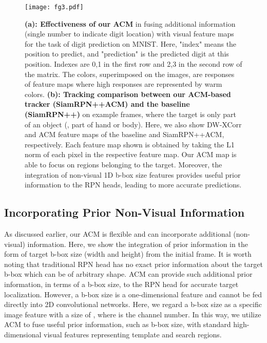 \documentclass[10pt,twocolumn,letterpaper,final]{cvpr}
\begin{document}
\begin{figure}
  \centering
  \texttt{[image: fg3.pdf]}
  \caption{\textbf{(a): Effectiveness of our ACM} in fusing additional information (single number to indicate digit location) with visual feature maps for the task of digit prediction on MNIST. Here, "index" means the position to predict, and "prediction" is the predicted digit at this position. Indexes are 0,1 in the first row and 2,3 in the second row of the  matrix. The colors, superimposed on the images, are responses of feature maps where high responses are represented by warm colors.  \textbf{(b): Tracking comparison between our ACM-based tracker (SiamRPN++ACM) and the baseline (SiamRPN++)} on example frames, where the target is only part of an object (\eg, part of hand or body). Here,
  we also show DW-XCorr and ACM feature maps of the baseline and SiamRPN++ACM, respectively. Each feature map shown is obtained by taking the L1 norm of each pixel in the respective feature map. Our ACM map is able to focus on regions belonging to the target. Moreover, the integration of non-visual 1D b-box size features provides useful prior information to the RPN heads, leading to more accurate predictions.   
 }\label{Fig:index_exp}
\end{figure}






\subsection{Incorporating Prior Non-Visual Information}  \label{section:bbox}

As discussed earlier, our ACM is flexible and can incorporate additional (non-visual) information. Here, we show the integration of prior information in the form of target b-box size (width and height) from the initial frame. It is worth noting that traditional RPN head has no exact prior information about the target b-box which can be of arbitrary shape. ACM can provide such additional prior information, in terms of a b-box size, to the RPN head for accurate target localization. However, a b-box size is a one-dimensional feature and cannot be fed directly into 2D convolutional networks. Here, we regard a b-box size as a specific image feature with a size of , where  is the channel number. In this way, we utilize ACM to fuse useful prior information, such as b-box size, with standard high-dimensional visual features representing template and search regions. 
\end{document}
